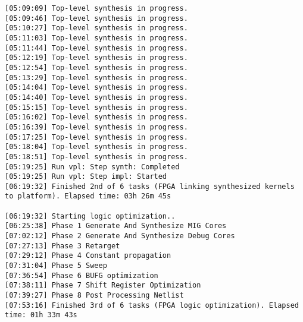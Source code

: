 \begin{center}
\begin{lstlisting}[label=lst:vlog,caption=Файл v++\_vinc.log]
[05:09:09] Top-level synthesis in progress.
[05:09:46] Top-level synthesis in progress.
[05:10:27] Top-level synthesis in progress.
[05:11:03] Top-level synthesis in progress.
[05:11:44] Top-level synthesis in progress.
[05:12:19] Top-level synthesis in progress.
[05:12:54] Top-level synthesis in progress.
[05:13:29] Top-level synthesis in progress.
[05:14:04] Top-level synthesis in progress.
[05:14:40] Top-level synthesis in progress.
[05:15:15] Top-level synthesis in progress.
[05:16:02] Top-level synthesis in progress.
[05:16:39] Top-level synthesis in progress.
[05:17:25] Top-level synthesis in progress.
[05:18:04] Top-level synthesis in progress.
[05:18:51] Top-level synthesis in progress.
[05:19:25] Run vpl: Step synth: Completed
[05:19:25] Run vpl: Step impl: Started
[06:19:32] Finished 2nd of 6 tasks (FPGA linking synthesized kernels to platform). Elapsed time: 03h 26m 45s 

[06:19:32] Starting logic optimization..
[06:25:38] Phase 1 Generate And Synthesize MIG Cores
[07:02:12] Phase 2 Generate And Synthesize Debug Cores
[07:27:13] Phase 3 Retarget
[07:29:12] Phase 4 Constant propagation
[07:31:04] Phase 5 Sweep
[07:36:54] Phase 6 BUFG optimization
[07:38:11] Phase 7 Shift Register Optimization
[07:39:27] Phase 8 Post Processing Netlist
[07:53:16] Finished 3rd of 6 tasks (FPGA logic optimization). Elapsed time: 01h 33m 43s 


\end{lstlisting}
\end{center}
